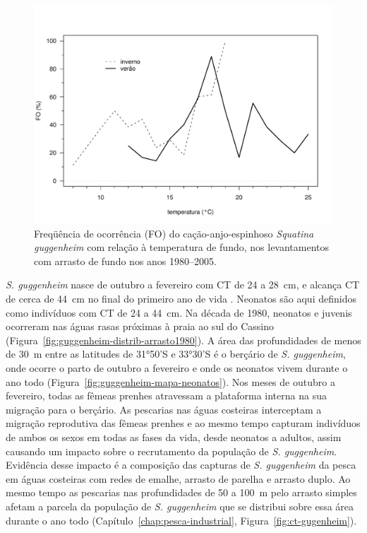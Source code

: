 \documentclass[a4paper,11pt,twoside,showtrims,onecolumn,openright,final]{memoir}
\begin{document}
\begin{figure}
\begin{center}
\includegraphics[width=\textwidth]{Guggenheim_DistribTempFundo}
\end{center}
\caption[Freqüência de ocorrência (FO) do cação-anjo-espinhoso \emph{Squatina guggenheim}
	 com relação à temperatura de fundo]
	{Freqüência de ocorrência (FO) do cação-anjo-espinhoso \emph{Squatina guggenheim}
	 com relação à temperatura de fundo, nos levantamentos com 
	 arrasto de fundo nos anos 1980--2005.}
\label{fig:guggenheim-distrib-tempfundo}
\end{figure}


\emph{S. guggenheim} nasce de outubro a fevereiro com CT de 24 a 28~cm, e alcança CT de cerca 
de 44~cm no final do primeiro ano de vida \citep{silva1996}. %
Neonatos são aqui definidos como indivíduos com  CT de 24 a 44~cm. 
Na década de 1980, neonatos e juvenis ocorreram nas águas 
rasas próximas à praia ao sul do Cassino (Figura~\ref{fig:guggenheim-distrib-arrasto1980}).  %
A área das profundidades de menos de 30~m entre as latitudes de 31°50'S e 33°30'S é o berçário 
de \emph{S. guggenheim}, onde ocorre o parto de outubro a fevereiro 
e onde os neonatos vivem durante o ano todo (Figura~\ref{fig:guggenheim-mapa-neonatos}). %
Nos meses de outubro a fevereiro, todas as fêmeas prenhes atravessam a 
plataforma interna na sua migração para o berçário. As pescarias nas águas costeiras 
interceptam a migração reprodutiva das fêmeas prenhes e ao mesmo tempo capturam 
indivíduos de ambos os sexos em todas as fases da vida, desde neonatos a adultos, 
assim causando um impacto sobre o recrutamento da população de \emph{S. guggenheim}. 
Evidência desse impacto é a composição das capturas de \emph{S. guggenheim} da pesca 
em águas costeiras com redes de emalhe, arrasto de parelha e arrasto duplo. 
Ao mesmo tempo as pescarias nas profundidades de 50 a 100~m pelo arrasto simples
afetam a parcela da população de \emph{S. guggenheim} que se distribui sobre 
essa área durante o ano todo (Capítulo~\ref{chap:pesca-industrial}, Figura~\ref{fig:ct-gugenheim}).  %
\end{document}
